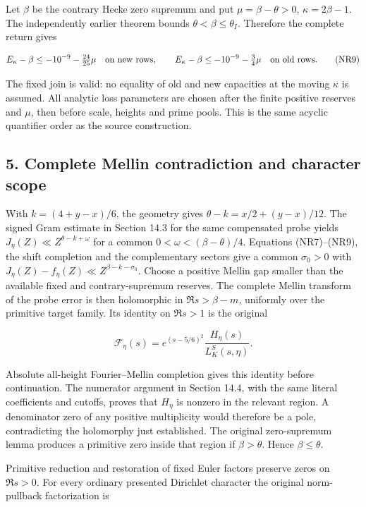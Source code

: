 Let \(\beta\) be the contrary Hecke zero supremum and put \(\mu=\beta-\theta>0\), \(\kappa=2\beta-1\). The independently earlier theorem bounds \(\theta<\beta\le\theta_I\). Therefore the complete return gives

\[
 E_\kappa-\beta\le-10^{-9}-\tfrac{24}{25}\mu
 \quad\hbox{on new rows},\qquad
 E_\kappa-\beta\le-10^{-9}-\tfrac34\mu
 \quad\hbox{on old rows}.
\tag{NR9}
\]

The fixed join is valid: no equality of old and new capacities at the moving \(\kappa\) is assumed. All analytic loss parameters are chosen after the finite positive reserves and \(\mu\), then before scale, heights and prime pools. This is the same acyclic quantifier order as the source construction.

\hypertarget{return:complete-mellin-contradiction-and-character-scope}{%
\subsection{5. Complete Mellin contradiction and character scope}\label{return:complete-mellin-contradiction-and-character-scope}}

With \(k=(4+y-x)/6\), the geometry gives \(\theta-k=x/2+(y-x)/12\). The signed Gram estimate in Section 14.3 for the same compensated probe yields \(J_\eta(Z)\ll Z^{\theta-k+\omega}\) for a common \(0<\omega<(\beta-\theta)/4\). Equations (NR7)--(NR9), the shift completion and the complementary sectors give a common \(\sigma_0>0\) with \(J_\eta(Z)-f_\eta(Z)\ll Z^{\beta-k-\sigma_0}\). Choose a positive Mellin gap smaller than the available fixed and contrary-supremum reserves. The complete Mellin transform of the probe error is then holomorphic in \(\Re s>\beta-m\), uniformly over the primitive target family. Its identity on \(\Re s>1\) is the original

\[
 \mathcal F_\eta(s)
   =e^{(s-5/6)^2}\frac{H_\eta(s)}{L_K^S(s,\eta)}.
\tag{NR10}
\]

Absolute all-height Fourier--Mellin completion gives this identity before continuation. The numerator argument in Section 14.4, with the same literal coefficients and cutoffs, proves that \(H_\eta\) is nonzero in the relevant region. A denominator zero of any positive multiplicity would therefore be a pole, contradicting the holomorphy just established. The original zero-supremum lemma produces a primitive zero inside that region if \(\beta>\theta\). Hence \(\beta\le\theta\).

Primitive reduction and restoration of fixed Euler factors preserve zeros on \(\Re s>0\). For every ordinary presented Dirichlet character the original norm-pullback factorization is

